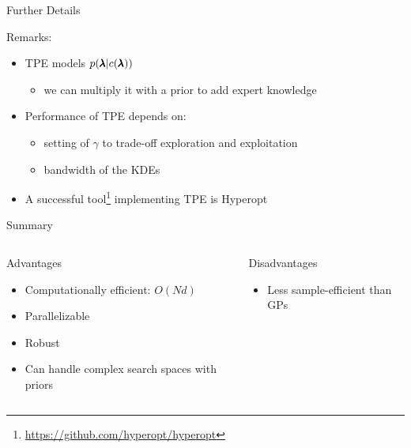 \begin{frame}[c]{Further Details}

Remarks:

\begin{itemize}
	\item TPE models $p(\pmb{\lambda} | c({\pmb{\lambda}}))$
	\begin{itemize}
		\item we can multiply it with a prior to add expert knowledge
	\end{itemize}
	\smallskip
	
	\fhpause
	
	\item Performance of TPE depends on:
	\begin{itemize}
		\item setting of $\gamma$ to trade-off exploration and exploitation
		\item bandwidth of the KDEs 
	\end{itemize}
	
	\fhpause
	
	\smallskip
	
	\smallskip
	\item A successful tool\footnote{\url{https://github.com/hyperopt/hyperopt}} implementing TPE is Hyperopt %
\end{itemize}

\end{frame}
\begin{frame}[c]{Summary}

\begin{columns}[T] %
\begin{column}{.48\textwidth}
    \begin{block}{Advantages}
    \begin{itemize}
    	\item Computationally efficient: $O(Nd)$
    	\item Parallelizable
    	\item Robust
    	\item Can handle complex search spaces with priors
    \end{itemize}
    \end{block}
\end{column}%

\hfill%

\fhpause

\begin{column}{.48\textwidth}
    \begin{block}{Disadvantages}
    \begin{itemize}
    	\item Less sample-efficient than GPs
    \end{itemize}
    \end{block}
\end{column}
\end{columns}   

\end{frame}
